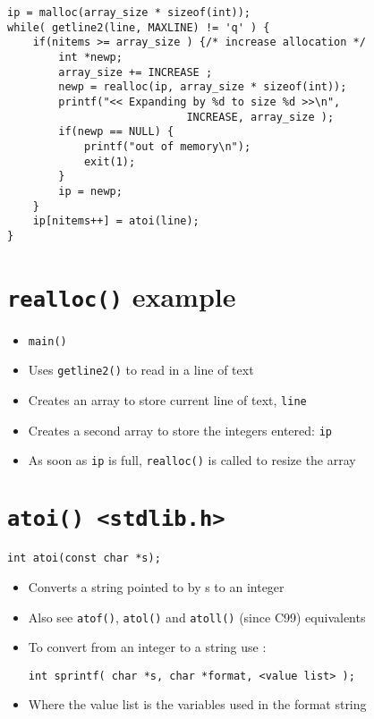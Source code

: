 \documentclass{article}
\begin{document}
\begin{verbatim}
ip = malloc(array_size * sizeof(int));
while( getline2(line, MAXLINE) != 'q' ) {
    if(nitems >= array_size ) {/* increase allocation */
        int *newp;
        array_size += INCREASE ;
        newp = realloc(ip, array_size * sizeof(int));
        printf("<< Expanding by %d to size %d >>\n",
                            INCREASE, array_size );
        if(newp == NULL) {
            printf("out of memory\n");
            exit(1);
        }
        ip = newp;
    }
    ip[nitems++] = atoi(line);
}
\end{verbatim}



\section{\texttt{realloc()} example}
\begin{itemize}
\item \verb!main()!

\item Uses \verb!getline2()! to read in a line of text

\item Creates an array to store current line of text,  \verb!line!

\item Creates a second array to store the integers entered: \verb!ip!

\item As soon as \verb!ip! is full, \verb!realloc()! is called to resize the array
\end{itemize}



\section{\texttt{atoi() <stdlib.h>}}
\begin{verbatim}
int atoi(const char *s);
\end{verbatim}

\begin{itemize}
\item Converts a string pointed to by  s  to an integer

\item Also see \verb!atof()!, \verb!atol()! and \verb!atoll()! (since C99) equivalents

\item To convert from an integer to a string use :

\begin{verbatim}
int sprintf( char *s, char *format, <value list> );
\end{verbatim}

\item Where the value list is the variables used in the format string
\end{itemize}
\end{document}
